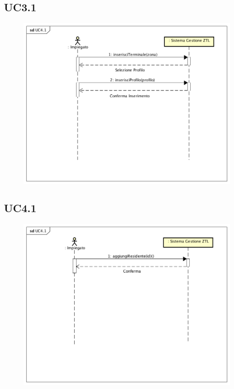 \documentclass[12pt, letterpaper]{article}
\begin{document}
\subsection{UC3.1}
\begin{figure}[H]
    \centering
    \includegraphics[scale=0.50]{SSD-UC3.1}
    \label{fig:mesh1}
\end{figure}

\subsection{UC4.1}
\begin{figure}[H]
    \centering
    \includegraphics[scale=0.50]{SSD-UC4.1}
    \label{fig:mesh1}
\end{figure}
\end{document}
